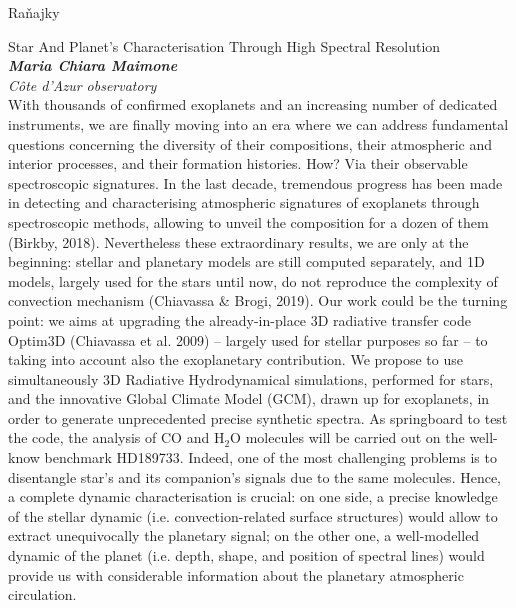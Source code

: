 \documentclass[a4paper]{report}
\begin{document}
                    \begin{tcolorbox}[
                                    colback=red!10,
                    colframe=red!50!black,
                                fonttitle=\Large\bfseries,
                title=09:00
            ]
                {\Large Raňajky}
                                            \end{tcolorbox}
                    \begin{tcolorbox}[
                                    colback=white,
                    colframe=black!70!white,
                                fonttitle=\Large\bfseries,
                title=10:00
            ]
                {\Large Star And Planet’s Characterisation Through High Spectral Resolution}
                                                            \\ \textbf{\textit{Maria Chiara Maimone}}
                                        \\ \textit{Côte d’Azur observatory}                                \\[2ex]With thousands of confirmed exoplanets and an increasing number of dedicated instruments, we are finally moving into an era where we can address fundamental questions concerning the diversity of their compositions, their atmospheric and interior processes, and their formation histories. How? Via their observable spectroscopic signatures. In the last decade, tremendous progress has been made in detecting and characterising atmospheric signatures of exoplanets through spectroscopic methods, allowing to unveil the composition for a dozen of them (Birkby, 2018). Nevertheless these extraordinary results, we are only at the beginning: stellar and planetary models are still computed separately, and 1D models, largely used for the stars until now, do not reproduce the complexity of convection mechanism (Chiavassa \& Brogi, 2019). Our work could be the turning point: we aims at upgrading the already-in-place 3D radiative transfer code Optim3D (Chiavassa et al. 2009) -- largely used for stellar purposes so far -- to taking into account also the exoplanetary contribution. We propose to use simultaneously 3D Radiative Hydrodynamical simulations, performed for stars, and the innovative Global Climate Model (GCM), drawn up for exoplanets, in order to generate unprecedented precise synthetic spectra. As springboard to test the code, the analysis of CO and $\mathrm{H}_2\mathrm{O}$ molecules will be carried out on the well-know benchmark HD189733. Indeed, one of the most challenging problems is to disentangle star’s and its companion’s signals due to the same molecules. Hence, a complete dynamic characterisation is crucial: on one side, a precise knowledge of the stellar dynamic (i.e. convection-related surface structures) would allow to extract unequivocally the planetary signal; on the other one, a well-modelled dynamic of the planet (i.e. depth, shape, and position of spectral lines) would provide us with considerable information about the planetary atmospheric circulation.
            \end{tcolorbox}
            
\end{document}

